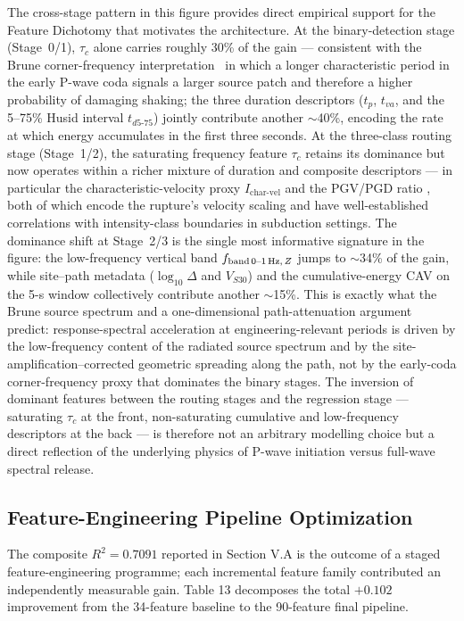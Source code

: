 \documentclass[10pt]{article}
\renewcommand{\cite}[1]{\citep{#1}}
\begin{document}
The cross-stage pattern in this figure provides direct empirical support for the Feature Dichotomy that motivates the architecture. At the binary-detection stage (Stage~0/1), $\tau_c$ alone carries roughly 30\% of the gain --- consistent with the Brune corner-frequency interpretation~\cite{ref54} in which a longer characteristic period in the early P-wave coda signals a larger source patch and therefore a higher probability of damaging shaking; the three duration descriptors ($t_p$, $t_{va}$, and the 5--75\% Husid interval $t_{d5\text{-}75}$) jointly contribute another $\sim$40\%, encoding the rate at which energy accumulates in the first three seconds. At the three-class routing stage (Stage~1/2), the saturating frequency feature $\tau_c$ retains its dominance but now operates within a richer mixture of duration and composite descriptors --- in particular the characteristic-velocity proxy $I_{\text{char-vel}}$ and the PGV/PGD ratio \cite{ref29}, both of which encode the rupture's velocity scaling and have well-established correlations with intensity-class boundaries in subduction settings. The dominance shift at Stage~2/3 is the single most informative signature in the figure: the low-frequency vertical band $f_{\text{band\,0--1\,Hz},\,Z}$ jumps to $\sim$34\% of the gain, while site--path metadata ($\log_{10}\!\Delta$ and $V_{S30}$) and the cumulative-energy CAV on the 5-s window collectively contribute another $\sim$15\%. This is exactly what the Brune source spectrum and a one-dimensional path-attenuation argument predict: response-spectral acceleration at engineering-relevant periods is driven by the low-frequency content of the radiated source spectrum and by the site-amplification--corrected geometric spreading along the path, not by the early-coda corner-frequency proxy that dominates the binary stages. The inversion of dominant features between the routing stages and the regression stage --- saturating $\tau_c$ at the front, non-saturating cumulative and low-frequency descriptors at the back --- is therefore not an arbitrary modelling choice but a direct reflection of the underlying physics of P-wave initiation versus full-wave spectral release.

\subsection{Feature-Engineering Pipeline Optimization}

The composite \(R^2 = 0.7091\) reported in Section V.A is the outcome of a staged feature-engineering programme; each incremental feature family contributed an independently measurable gain. Table 13 decomposes the total \(+0.102\) improvement from the 34-feature baseline to the 90-feature final pipeline.
\end{document}
